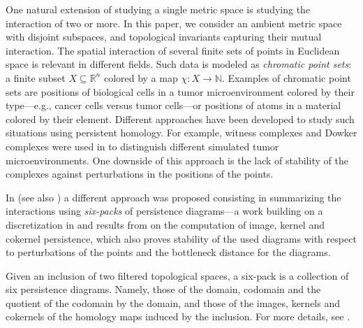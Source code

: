 \documentclass[8pt,a4paper,oneside,english,english]{article}
\theoremstyle{plain}
\theoremstyle
{plain}
\theoremstyle{definition}
\newcommand{\N}{\mathbb{N}}
\newcommand{\R}{\mathbb{R}}
\begin{document}
One natural extension of studying a single metric space is studying the interaction of two or more. In this paper, we consider an ambient metric space with disjoint subspaces, and topological invariants capturing their mutual interaction. The spatial interaction of several finite sets of points in Euclidean space is relevant in different fields. Such data is modeled as \emph{chromatic point sets}: a finite subset $X
\subseteq \R^n$ colored by a map $\chi\colon X
\rightarrow \N$. 
Examples of chromatic point sets are positions of biological cells in a tumor microenvironment colored by their type---e.g., cancer cells versus tumor cells---or positions of atoms in a material colored by their element. Different approaches have been developed to study such situations using persistent homology. For example, witness complexes \cite{DabMemFraCar} and Dowker complexes \cite{ChoMem3} were used in \cite{StoDheBul} to distinguish different simulated tumor microenvironments. One downside of this approach is the lack of stability of the complexes against perturbations in the positions of the points.

In \cite{CulDraEdeSag1} (see also \cite{CulDraEdeSag2}) a different approach was proposed consisting in summarizing the interactions using \emph{six-packs} of persistence diagrams---a work building on a discretization in \cite{BobRea} and results from \cite{Coh-SteEdeHarMor} on the computation of image, kernel and cokernel persistence, which also proves stability of the used diagrams with respect to perturbations of the points and the bottleneck distance for the diagrams.

Given an inclusion of two filtered topological spaces, a six-pack is a collection of six persistence diagrams. Namely, those of the domain, codomain and the quotient of the codomain by the domain, and those of the images, kernels and cokernels of the homology maps induced by the inclusion.
For more details, see \cite[Section~5.2]{CulDraEdeSag1}.
\end{document}
